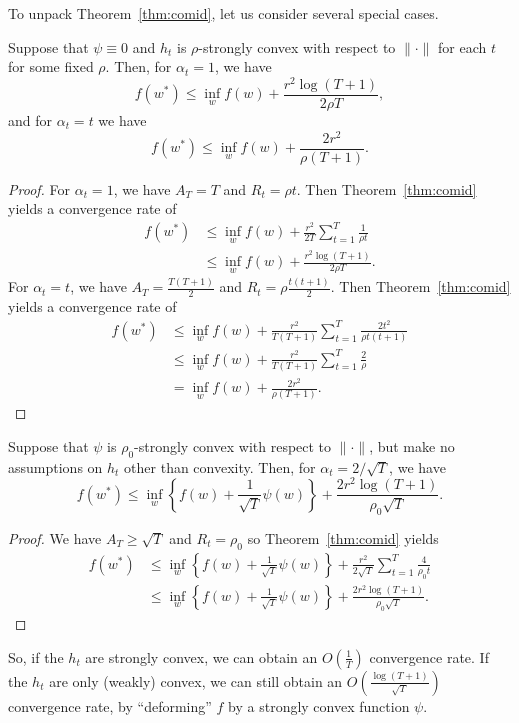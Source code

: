 \documentclass[paper.tex]{subfiles}
\begin{document}
To unpack Theorem~\ref{thm:comid}, let us consider several special cases.
\begin{corollary}
Suppose that $\psi \equiv 0$ and $h_t$ is $\rho$-strongly convex with respect to 
$\|\cdot\|$ for each $t$ for some fixed $\rho$. Then, for $\alpha_t = 1$, we have
\[ f(w^*) \leq \inf_w f(w) + \frac{r^2 \log(T+1)}{2\rho T}, \]
and for $\alpha_t = t$ we have
\[ f(w^*) \leq \inf_w f(w) + \frac{2r^2}{\rho (T+1)}. \]
\end{corollary}
\begin{proof}
For $\alpha_t = 1$, we have $A_T = T$ and $R_t = \rho t$. Then Theorem~\ref{thm:comid} 
yields a convergence rate of
\begin{align*}
f(w^*) &\leq \inf_w f(w) + \frac{r^2}{2T} \sum_{t=1}^T \frac{1}{\rho t} \\
 &\leq \inf_w f(w) + \frac{r^2 \log(T+1)}{2\rho T}.
\end{align*}
For $\alpha_t = t$, we have $A_T = \frac{T(T+1)}{2}$ and $R_t = \rho \frac{t(t+1)}{2}$. 
Then Theorem~\ref{thm:comid} yields a convergence rate of
\begin{align*}
f(w^*) &\leq \inf_w f(w) + \frac{r^2}{T(T+1)} \sum_{t=1}^T \frac{2t^2}{\rho t(t+1)} \\
 &\leq \inf_w f(w) + \frac{r^2}{T(T+1)} \sum_{t=1}^T \frac{2}{\rho} \\
 &= \inf_w f(w) + \frac{2r^2}{\rho (T+1)}.
\end{align*}
\end{proof}

\begin{corollary}
Suppose that $\psi$ is $\rho_0$-strongly convex with respect to $\|\cdot\|$, but make 
no assumptions on $h_t$ other than convexity. Then, for $\alpha_t = 2/\sqrt{T}$,
 we have
\[ f(w^*) \leq \inf_w \left\{ f(w) + \frac{1}{\sqrt{T}} \psi(w)\right\} + \frac{2r^2 \log(T+1)}{\rho_0\sqrt{T}}. \]
\end{corollary}
\begin{proof}
We have $A_T \ge \sqrt{T}$ and $R_t = \rho_0$ so Theorem~\ref{thm:comid} yields
\begin{align*}
f(w^*) 
&\leq \inf_w \left\{ f(w) + \frac{1}{\sqrt{T}} \psi(w)\right\} + \frac{r^2}{2\sqrt{T}} \sum_{t=1}^T \frac{4}{\rho_0 t} \\
&\leq \inf_w \left\{ f(w) + \frac{1}{\sqrt{T}} \psi(w)\right\} + \frac{2r^2\log(T+1)}{\rho_0\sqrt{T}}.
\end{align*}
\end{proof}
So, if the $h_t$ are strongly convex, we can obtain an $O\left(\frac{1}{T}\right)$ 
convergence rate. If the $h_t$ are only (weakly) convex, we can still obtain an 
$O\left(\frac{\log(T+1)}{\sqrt{T}}\right)$ convergence rate, by ``deforming'' $f$ by a 
strongly convex function $\psi$.
\end{document}
